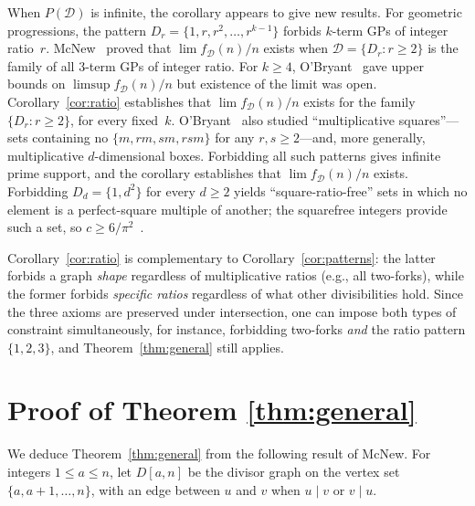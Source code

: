 \documentclass[11pt]{amsart}
\begin{document}
When \(P(\mathcal{D})\) is infinite, the corollary appears to give new results. For geometric progressions, the pattern \(D_r=\{1,r,r^2,\dots,r^{k-1}\}\) forbids \(k\)-term GPs of integer ratio~\(r\). McNew~\cite{McNew15} proved that \(\lim f_{\mathcal{D}}(n)/n\) exists when \(\mathcal{D}=\{D_r:r\ge 2\}\) is the family of all \(3\)-term GPs of integer ratio. For \(k\ge 4\), O'Bryant~\cite{OB15} gave upper bounds on \(\limsup f_{\mathcal{D}}(n)/n\) but existence of the limit was open. Corollary~\ref{cor:ratio} establishes that \(\lim f_{\mathcal{D}}(n)/n\) exists for the family \(\{D_r:r\ge 2\}\), for every fixed~\(k\). O'Bryant~\cite{OB15} also studied ``multiplicative squares''---sets containing no \(\{m,rm,sm,rsm\}\) for any \(r,s\ge 2\)---and, more generally, multiplicative \(d\)-dimensional boxes. Forbidding all such patterns gives infinite prime support, and the corollary establishes that \(\lim f_{\mathcal{D}}(n)/n\) exists. Forbidding \(D_d=\{1,d^2\}\) for every \(d\ge 2\) yields ``square-ratio-free'' sets in which no element is a perfect-square multiple of another; the squarefree integers provide such a set, so \(c\ge 6/\pi^2\)~\cite[\S18.6]{HW08}.

Corollary~\ref{cor:ratio} is complementary to Corollary~\ref{cor:patterns}: the latter forbids a graph \emph{shape} regardless of multiplicative ratios (e.g., all two-forks), while the former forbids \emph{specific ratios} regardless of what other divisibilities hold. Since the three axioms are preserved under intersection, one can impose both types of constraint simultaneously, for instance, forbidding two-forks \emph{and} the ratio pattern \(\{1,2,3\}\), and Theorem~\ref{thm:general} still applies.

\section{Proof of Theorem \ref{thm:general}}

We deduce Theorem~\ref{thm:general} from the following result of McNew. For integers \(1\le a\le n\), let \(D[a,n]\) be the divisor graph on the vertex set \(\{a,a+1,\dots,n\}\), with an edge between \(u\) and \(v\) when \(u\mid v\) or \(v\mid u\).
\end{document}
